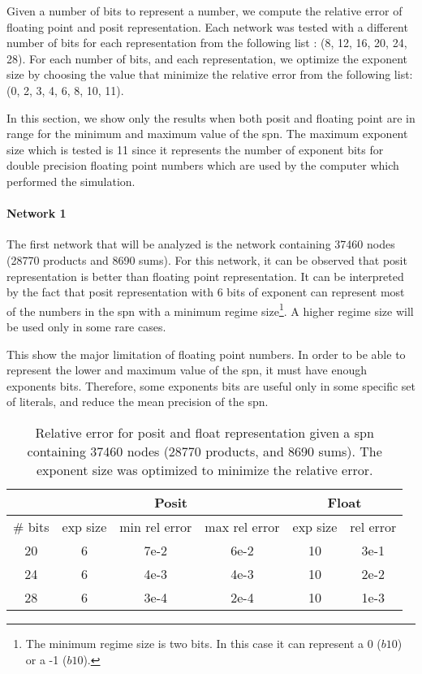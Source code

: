 Given a number of bits to represent a number, we compute the relative error of floating point and posit representation. Each network was tested with a different number of bits for each representation from the following list : (8, 12, 16, 20, 24, 28). For each number of bits, and each representation, we optimize the exponent size by choosing the value that minimize the relative error from the following list: (0, 2, 3, 4, 6, 8, 10, 11).

In this section, we show only the results when both posit and floating point are in range for the minimum and maximum value of the \gls{spn}. The maximum exponent size which is tested is 11 since it represents the number of exponent bits for double precision floating point numbers which are used by the computer which performed the simulation.

\paragraph{Network 1}

The first network that will be analyzed is the network containing 37460 nodes (28770 products and 8690 sums). For this network, it can be observed that posit representation is better than floating point representation. It can be interpreted by the fact that posit representation with 6 bits of exponent can represent most of the numbers in the \gls{spn} with a minimum regime size\footnote{The minimum regime size is two bits. In this case it can represent a 0 ($b10$) or a -1 ($b10$).}. A higher regime size will be used only in some rare cases.

This show the major limitation of floating point numbers. In order to be able to represent the lower and maximum value of the \gls{spn}, it must have enough exponents bits. Therefore, some exponents bits are useful only in some specific set of literals, and reduce the mean precision of the \gls{spn}.

\begin{table}[!ht]
	\centering
	\caption{Relative error for posit and float representation given a \gls{spn} containing 37460 nodes (28770 products, and 8690 sums). The exponent size was optimized to minimize the relative error.}
	\label{tab:net1_res}
	\begin{tabular}{|c||c|c|c||c|c|}
	\hline
		& \multicolumn{3}{c||}{Posit} &  \multicolumn{2}{c|}{Float} \\
	\hline
		\# bits & exp size & min rel error & max rel error & exp size & rel error \\
	\hline
		20 & 6 & 7e-2 & 6e-2 & 10 & 3e-1 \\
		24 & 6 & 4e-3 & 4e-3 & 10 & 2e-2 \\
		28 & 6 & 3e-4 & 2e-4 & 10 & 1e-3 \\
	\hline
	\end{tabular}
\end{table}


